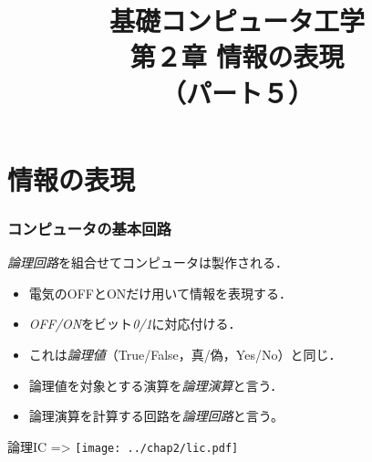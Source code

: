 \documentclass{beamer}                 %
\begin{document}
\title{基礎コンピュータ工学\\第２章 情報の表現\\（パート５）}
\date{}

\begin{frame}
  \titlepage
\end{frame}


\section{情報の表現}
\begin{frame}
  \frametitle{コンピュータの基本回路}
  \emph{論理回路}を組合せてコンピュータは製作される．
  \begin{itemize}
  \item 電気のOFFとONだけ用いて情報を表現する．
  \item \emph{OFF/ON}をビット\emph{0/1}に対応付ける．
  \item これは\emph{論理値}（True/False，真/偽，Yes/No）と同じ．
  \item 論理値を対象とする演算を\emph{論理演算}と言う．
  \item 論理演算を計算する回路を\emph{論理回路}と言う。
  \end{itemize}
  \vfill
  \centerline{論理IC => \texttt{[image: ../chap2/lic.pdf]}}
\end{frame}
\end{document}
